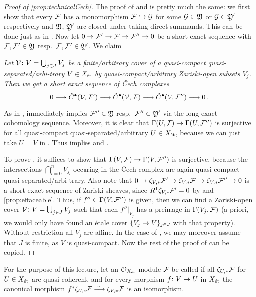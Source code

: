 \begin{proof}[Proof of \cref{prop:technicalCech}]
	The proof of  and  is pretty much the same: we first show that every $\mathcal{F}$ has a monomorphism $\Ff\monomorphism \Gg$ for some $\mathcal{G}\in \mathfrak{Y}$ or $\mathcal{G}\in \mathfrak{Y}'$ respectively and $\mathfrak{Y}$, $\mathfrak{Y}'$ are closed under taking direct summands. This can be done just as in . Now let $0\morphism \Ff'\morphism \Ff\morphism \Ff''\morphism 0$ be a short exact sequence with $\mathcal{F},\mathcal{F}'\in \mathfrak{Y}$ resp.\ $\mathcal{F},\mathcal{F}'\in \mathfrak{Y}'$. We claim
	\begin{alphanumerate}
		\item[\itememph{*'}] \itshape Let $\mathcal{V}\colon V=\bigcup_{j\in J}V_j$ be a finite/arbitrary cover of a quasi-compact quasi-separated/arbi-trary $V\in X_{\mathrm{\acute{e}t}}$ by quasi-compact/arbitrary Zariski-open subsets $V_j$. Then we get a short exact sequence of \v Cech complexes
		\begin{equation*}
		0\morphism \check{C}^\bullet(\Vv,\Ff')\morphism \check{C}^\bullet(\Vv,\Ff)\morphism \check{C}^\bullet(\Vv,\Ff'')\morphism 0\,.
		\end{equation*}
	\end{alphanumerate}
	As in ,  immediately implies $\mathcal{F}''\in \mathfrak{Y}$ resp.\ $\mathcal{F}''\in \mathfrak{Y}'$ via the long exact cohomology sequence. Moreover, it is clear that $\Global(U,\Ff)\morphism \Global(U,\Ff'')$ is surjective for all quasi-compact quasi-separated/arbitrary $U\in X_{\mathrm{\acute{e}t}}$, because we can just take $U=V$ in . Thus  implies  and .
	
	To prove , it suffices to show that $\Global(V,\Ff)\morphism \Global(V,\Ff'')$ is surjective, because the intersections $\bigcap_{l=0}^nV_{j_l}$ occuring in the \v Cech complex are again quasi-compact quasi-separated/arbi-trary. Also note that $0\morphism \zeta_{V,*}\Ff'\morphism \zeta_{V,*}\Ff\morphism \zeta_{V,*}\Ff''\morphism 0$ is a short exact sequence of Zariski sheaves, since $R^1\zeta_{V,*}\mathcal{F}'=0$ by  and \cref{prop:effaceable}. Thus, if $f''\in \operatorname{\Gamma}(V,\mathcal{F}'')$ is given, then we can find a Zariski-open cover $\mathcal{V}\colon V=\bigcup_{j\in J}V_j$ such that each $f''|_{V_j}$ has a preimage in $\operatorname{\Gamma}(V_j,\mathcal{F})$ (a priori, we would only have found an étale cover $\{V_j\morphism V\}_{j\in J}$ with that property). Without restriction all $V_j$ are affine. In the case of , we may moreover assume that $J$ is finite, as $V$ is quasi-compact. Now the rest of the proof of  can be copied.
\end{proof}
\begin{defi}
	For the purpose of this lecture, let an $\mathcal{O}_{X_{\mathrm{\acute{e}t}}}$-module $\mathcal{F}$ be called  if all $\zeta_{U,*}\mathcal{F}$ for $U\in X_{\mathrm{\acute{e}t}}$ are quasi-coherent, and for every morphism $f\colon V\morphism U$ in $X_{\mathrm{\acute{e}t}}$ the canonical morphism $f^*\zeta_{U,*}\Ff\isomorphism \zeta_{V,*}\Ff$ is an isomorphism.%
\end{defi}
